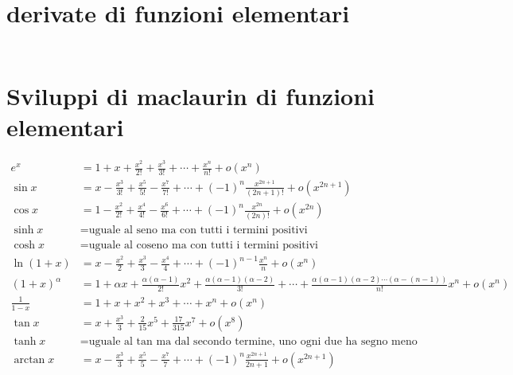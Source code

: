 \documentclass{article}
\begin{document}
\section{derivate di funzioni elementari}

\begin{align*}
\end{align*}

\section{Sviluppi di maclaurin di funzioni elementari}

\begin{align*}
e^x &=1+x+\frac{x^2}{2!}+\frac{x^3}{3!}+\cdots+\frac{x^n}{n!}+o(x^n)\\
\sin x&= x-\frac{x^3}{3!}+\frac{x^5}{5!}-\frac{x^7}{7!}+\cdots+(-1)^n\frac{x^{2n+1}}{(2n+1)!}+o\left(x^{2n+1}\right)\\
\cos x&= 1-\frac{x^2}{2!}+\frac{x^4}{4!}-\frac{x^6}{6!}+\cdots+(-1)^n\frac{x^{2n}}{(2n)!}+o\left(x^{2n}\right)\\
\sinh x &= \text{uguale al seno ma con tutti i termini positivi}\\
\cosh x &= \text{uguale al coseno ma con tutti i termini positivi}\\
\ln(1+x) &=x-\frac{x^2}{2}+\frac{x^3}{3}-\frac{x^4}{4}+\cdots+(-1)^{n-1}\frac{x^n}{n}+o(x^n)\\
(1+x)^\alpha &=1+\alpha x+\frac{\alpha (\alpha -1)}{2!}x^2+\frac{\alpha(\alpha-1)(\alpha-2)}{3!}+\cdots+\frac{\alpha(\alpha-1)(\alpha-2)\cdots(\alpha-(n-1))}{n!}x^n+o(x^n)\\
\frac{1}{1-x} &= 1+x+x^2+x^3+\cdots+x^n+o(x^n)\\
\tan x &= x+\frac{x^3}{3}+\frac{2}{15}x^5+\frac{17}{315}x^7+o(x^8)\\
\tanh x &= \text{uguale al tan ma dal secondo termine, uno ogni due ha segno meno}\\
\arctan x &= x-\frac{x^3}{3}+\frac{x^5}{5}-\frac{x^7}{7}+\cdots+(-1)^n\frac{x^{2n+1}}{2n+1}+o\left(x^{2n+1}\right)
\end{align*}
\end{document}
